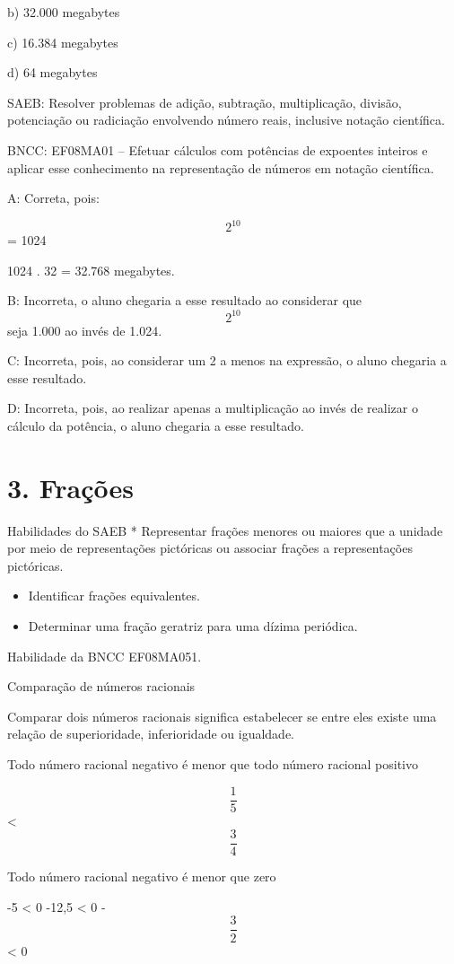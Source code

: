 b) 32.000 megabytes

c) 16.384 megabytes

d) 64 megabytes

SAEB: Resolver problemas de adição, subtração, multiplicação, divisão,
potenciação ou radiciação envolvendo número reais, inclusive notação
científica.

BNCC: EF08MA01 -- Efetuar cálculos com potências de expoentes inteiros e
aplicar esse conhecimento na representação de números em notação
científica.

A: Correta, pois:

\[2^10\] = 1024

1024 . 32 = 32.768 megabytes.

B: Incorreta, o aluno chegaria a esse resultado ao considerar que
\[2^{10}\] seja 1.000 ao invés de 1.024.

C: Incorreta, pois, ao considerar um 2 a menos na expressão, o aluno
chegaria a esse resultado.

D: Incorreta, pois, ao realizar apenas a multiplicação ao invés de
realizar o cálculo da potência, o aluno chegaria a esse resultado.


\section{3. Frações}

Habilidades do SAEB * Representar frações menores ou maiores que a
unidade por meio de representações pictóricas ou associar frações a
representações pictóricas.

\begin{itemize}
\item
  Identificar frações equivalentes.
\item
  Determinar uma fração geratriz para uma dízima periódica.
\end{itemize}

Habilidade da BNCC EF08MA051.

Comparação de números racionais

Comparar dois números racionais significa estabelecer se entre eles
existe uma relação de superioridade, inferioridade ou igualdade.

Todo número racional negativo é menor que todo número racional positivo

\[\frac{1}{5}\] \textless{} \[\frac{3}{4}\]

Todo número racional negativo é menor que zero

-5 \textless{} 0 -12,5 \textless{} 0 -\[\frac{3}{2}\] \textless{} 0

